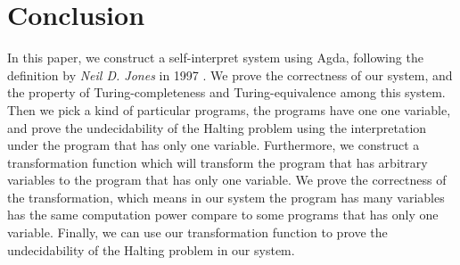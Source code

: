 \documentclass{jfrarticle}
\begin{document}
\section{Conclusion}
In this paper, we construct a self-interpret system using Agda, following the definition by \textit{Neil D. Jones} in 1997 \cite{jones_computability_1997}.
We prove the correctness of our system, and the property of Turing-completeness and Turing-equivalence among this system.
Then we pick a kind of particular programs, the programs have one one variable, and prove the undecidability of the Halting problem using the interpretation under the program that has only one variable.
Furthermore, we construct a transformation function which will transform the program that has arbitrary variables to the program that has only one variable.
We prove the correctness of the transformation, which means in our system the program has many variables has the same computation power compare to some programs that has only one variable.
Finally, we can use our transformation function to prove the undecidability of the Halting problem in our system.\\


{}
\end{document}
